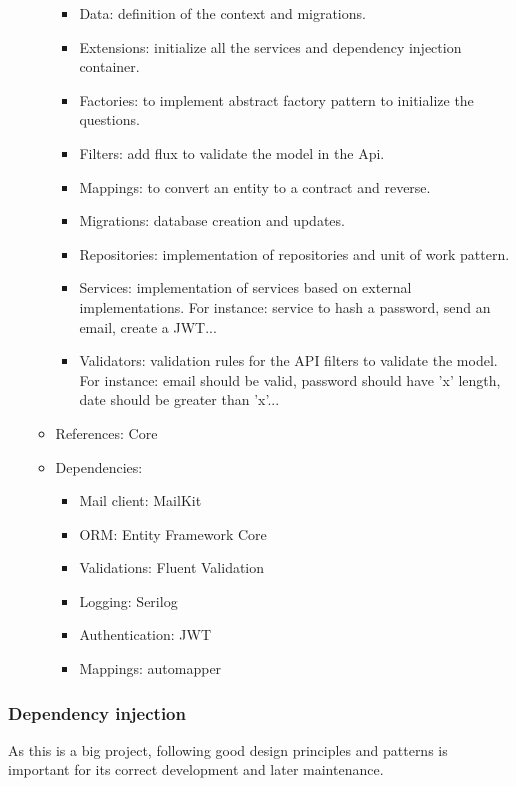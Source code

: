 \begin{itemize}
\begin{itemize}
\begin{itemize}
                            \item Data: definition of the context and migrations.
                            \item Extensions: initialize all the services and dependency injection container.
                            \item Factories: to implement abstract factory pattern to initialize the questions.
                            \item Filters: add flux to validate the model in the Api.
                            \item Mappings: to convert an entity to a contract and reverse.
                            \item Migrations: database creation and updates.
                            \item Repositories: implementation of repositories and unit of work pattern.
                            \item Services: implementation of services based on external implementations. For instance: service to hash a password, send an email, create a JWT...
                            \item Validators: validation rules for the API filters to validate the model. For instance: email should be valid, password should have 'x' length, date should be greater than 'x'...
                        \end{itemize}
                    \item References: Core
                    \item Dependencies:
                        \begin{itemize}
                            \item Mail client: MailKit
                            \item ORM: Entity Framework Core
                            \item Validations: Fluent Validation
                            \item Logging: Serilog
                            \item Authentication: JWT
                            \item Mappings: automapper
                        \end{itemize}
                \end{itemize}
        \end{itemize}

        \subsubsection{Dependency injection}
        As this is a big project, following good design principles and patterns is important for its correct development and later maintenance. \\

